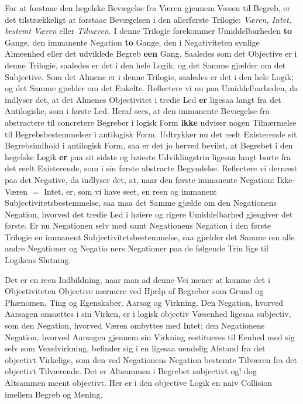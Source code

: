 \documentclass[11pt]{book}
\newcommand{\opage}[1]{\marginnote{\footnotesize\textit{[#1]}}}
\begin{document}
For at forstaae den hegelske Bevægelse fra Væren gjennem Væsen til
Begreb, er det tilstrækkeligt at forstaae Bevægelsen i den allerførste
Trilogie: \emph{Væren, Intet, bestemt Væren} eller \emph{Tilværen}. I
denne Trilogie forekommer Umiddelbarheden \textbf{to} Gange, den
immanente Negation \textbf{to} Gange, den i Negativiteten synlige
Almeenhed eller det udviklede Begreb \textbf{een} Gang. Saaledes som
det Objective er i denne Trilogie, saaledes er det i den hele Logik;
og det Samme gjælder om det Subjective. Som det Almene er i denne
Trilogie, saaledes er det i den hele Logik; og det Samme gjælder om
det Enkelte. Reflectere vi nu paa Umiddelbarheden, da indlyser det,
at det Almenes Objectivitet i tredie Led \textbf{er} ligesaa langt fra
det Antilogiske, som i første Led. Heraf sees, at den immanente
Bevægelse fra abstractere til concretere Begreber i logisk Form
\textbf{ikke} udviser nogen Tilnærmelse til Begrebsbestemmelser i
antilogisk Form. Udtrykker nu det reelt Existerende sit
Begrebsindhold i antilogisk Form, saa er det jo herved beviist, at
Begrebet i den hegelske Logik \textbf{er} paa sit sidste og høieste
Udviklingstrin ligesaa langt borte fra det reelt Existerende, som i
sin første abstracte Begyndelse. Reflectere vi dernæst paa det
Negative, da indlyser det, at, naar den første immanente Negation:
Ikke-Væren $=$ Intet, er, som vi have seet, en reen og immanent
Subjectivitetsbestemmelse, saa maa det Samme gjælde om den
Negationens Negation, hvorved det tredie Led i høiere og rigere
Umiddelbarhed gjengiver det første. Er nu Negationen selv med samt
Negationens Negation i den første Trilogie en immanent
Subjectivitetsbestemmelse, saa gjælder det Samme om alle andre
Negationer og Negatio\-%
\opage{153} \setcounter{footnote}{0}%
ners Negationer paa de følgende Trin lige til Logikens Slutning.

Det er en reen Indbildning, naar man ad denne Vei mener at komme det
i Objectiviteten Objective nærmere ved Hjælp af Begreber som Grund og
Phænomen, Ting og Egenskaber, Aarsag og Virkning. Den Negation,
hvorved Aarsagen omsættes i sin Virken, er i logisk objectiv Væsenhed
ligesaa subjectiv, som den Negation, hvorved Væren ombyttes med Intet;
den Negationens Negation, hvorved Aarsagen gjennem sin Virkning
restitueres til Eenhed med sig selv som Vexelvirkning, befinder sig i
en ligesaa uendelig Afstand fra det objectivt Virkelige, som den ved
Negationens Negation bestemte Tilværen fra det objectivt Tilværende.
Det er Altsammen i Begrebet subjectivt og! dog Altsammen meent
objectivt. Her er i den objective Logik en naiv Collision imellem
Begreb og Mening.
\end{document}
